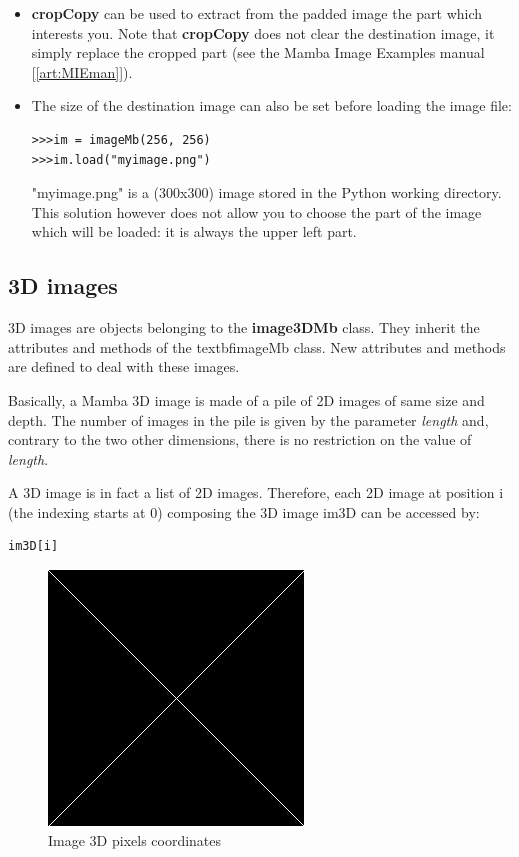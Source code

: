 \documentclass[a4paper,10pt,oneside]{article}
\begin{document}
\begin{itemize}
\item \textbf{cropCopy} can be used to extract from the padded image the part which interests you. Note that
\textbf{cropCopy} does not clear the destination image, it simply replace the cropped part (see the Mamba
Image Examples manual [\ref{art:MIEman}]).
\item The size of the destination image can also be set before loading the image file:

\lstset{language=Python}
\begin{lstlisting}
>>>im = imageMb(256, 256)
>>>im.load("myimage.png")
\end{lstlisting}

"myimage.png" is a (300x300) image stored in the Python working directory. This solution however does not allow you
to choose the part of the image which will be loaded: it is always the upper left part.
\end{itemize}

\subsection{3D images}
3D images are objects belonging to the \textbf{image3DMb} class. They inherit the attributes and methods of the
textbf{imageMb} class. New attributes and methods are defined to deal with these images.

Basically, a Mamba 3D image is made of a pile of 2D images of same size and depth. The number of images in
the pile is given by the parameter \textit{length} and, contrary to the two other dimensions, there is no restriction
on the value of \textit{length}.

A 3D image is in fact a list of 2D images. Therefore, each 2D image at position i (the indexing starts at 0) composing the 3D image im3D can
be accessed by:

\lstset{language=Python}
\begin{lstlisting}
im3D[i]
\end{lstlisting}

\begin{figure}
\centering
\includegraphics[scale=0.3]{figures/xxx.png}
\caption{Image 3D pixels coordinates}
\label{fig:image3D_coord}
\end{figure}
\end{document}
